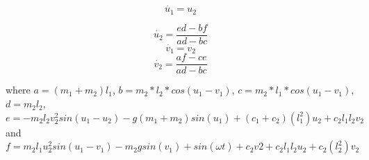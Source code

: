 \documentclass[12pt, a4paper]{extarticle}
\begin{document}
\begin{equation}
	\dot{u_1} = u_2
\end{equation}

\begin{equation}
	\dot{u_2} = \frac{ed-bf}{ad-bc}	
\end{equation}
\begin{equation}
	\dot{v_1} = v_2 
\end{equation}
\begin{equation}
	\dot{v_2} = \frac{af-ce}{ad-bc}	
\end{equation}

where $a = (m_1+m_2)l_1$, $b= m_2*l_2*cos(u_1-v_1)$, $c=m_2*l_1*cos(u_1-v_1)$, $d = m_2 l_2$, $e= -m_2 l_2 v_2^2 sin(u_1-u_2)-g(m_1+m_2) sin(u_1)+(c_1+c_2) (l_1^2) u_2+c_2 l_1 l_2 v_2$ and $f = m_2 l_1 u_2^2 sin(u_1-v_1)-m_2 g sin(v_1)+ sin(\omega t)+c_2 v2+c_2 l_1 l_2 u_2+c_2 (l_2^2) v_2$
\end{document}
